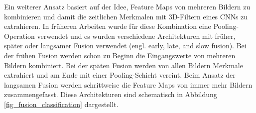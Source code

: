 Ein weiterer Ansatz basiert auf der Idee, Feature Maps von mehreren Bildern zu kombinieren und damit die zeitlichen Merkmalen mit 3D-Filtern eines \acp{CNN} zu extrahieren. In früheren Arbeiten wurde für diese Kombination eine Pooling-Operation verwendet \cite{karpathy2014large, yue2015beyond} und es wurden verschiedene Architekturen mit früher, später oder langsamer Fusion verwendet (engl. early, late, and slow fusion). Bei der frühen Fusion werden schon zu Beginn die Eingangswerte von mehreren Bildern kombiniert. Bei der späten Fusion werden von allen Bildern Merkmale extrahiert und am Ende mit einer Pooling-Schicht vereint. Beim Ansatz der langsamen Fusion werden schrittweise die Feature Maps von immer mehr Bildern zusammengefasst. Diese Architekturen sind schematisch in Abbildung \ref{fig_fusion_classification} dargestellt.

